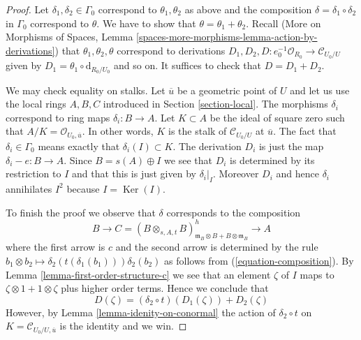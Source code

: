 \documentclass{stacks-project}
\theoremstyle{plain}
\theoremstyle{definition}
\theoremstyle{remark}
\numberwithin{equation}{subsection}
\def\Ker{\mathop{\mathrm{Ker}}}
\begin{document}
\begin{proof}
Let $\delta_1, \delta_2 \in \Gamma_0$ correspond to $\theta_1, \theta_2$
as above and the composition $\delta = \delta_1 \circ \delta_2$
in $\Gamma_0$ correspond to $\theta$. We have to show that
$\theta = \theta_1 + \theta_2$. Recall
(More on Morphisms of Spaces, Lemma
\ref{spaces-more-morphisms-lemma-action-by-derivations})
that $\theta_1, \theta_2, \theta$ correspond to derivations
$D_1, D_2, D : e_0^{-1}\mathcal{O}_{R_0} \to \mathcal{C}_{U_0/U}$
given by $D_1 = \theta_1 \circ \text{d}_{R_0/U_0}$ and so on.
It suffices to check that $D = D_1 + D_2$.

\medskip\noindent
We may check equality on stalks.
Let $\overline{u}$ be a geometric point of $U$ and let us use the local
rings $A, B, C$ introduced in Section \ref{section-local}.
The morphisms $\delta_i$ correspond to ring
maps $\delta_i : B \to A$. Let $K \subset A$ be the ideal of
square zero such that $A/K = \mathcal{O}_{U_0, \overline{u}}$.
In other words, $K$ is the stalk of $\mathcal{C}_{U_0/U}$ at $\overline{u}$.
The fact that $\delta_i \in \Gamma_0$
means exactly that $\delta_i(I) \subset K$.
The derivation $D_i$ is just the map $\delta_i - e : B \to A$.
Since $B = s(A) \oplus I$ we see that $D_i$ is determined by
its restriction to $I$ and that this is just given by
$\delta_i|_I$. Moreover $D_i$ and hence $\delta_i$ annihilates $I^2$
because $I = \Ker(I)$.

\medskip\noindent
To finish the proof we observe that $\delta$ corresponds to the
composition
$$
B \to C =
(B \otimes_{s, A, t} B)^h_{\mathfrak m_B \otimes B + B \otimes \mathfrak m_B}
\to A
$$
where the first arrow is $c$ and the second arrow is determined
by the rule
$b_1 \otimes b_2 \mapsto \delta_2(t(\delta_1(b_1))) \delta_2(b_2)$
as follows from (\ref{equation-composition}).
By Lemma \ref{lemma-first-order-structure-c}
we see that an element $\zeta$ of $I$ maps to
$\zeta \otimes 1 + 1 \otimes \zeta$ plus higher order terms.
Hence we conclude that
$$
D(\zeta) = (\delta_2 \circ t)\left(D_1(\zeta)\right) + D_2(\zeta)
$$
However, by Lemma \ref{lemma-idenity-on-conormal}
the action of $\delta_2 \circ t$ on
$K = \mathcal{C}_{U_0/U, \overline{u}}$ is the identity and
we win.
\end{proof}
\end{document}
